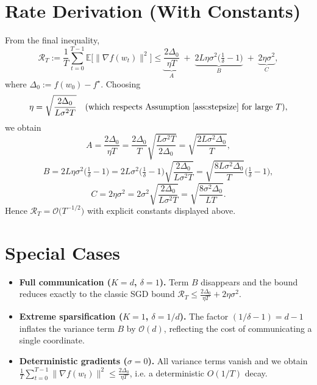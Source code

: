 \documentclass{article}
\newcommand{\E}{\mathbb{E}}
\begin{document}
\section*{Rate Derivation (With Constants)}
From the final inequality,
\[
\mathcal{R}_T:=\frac{1}{T}\sum_{t=0}^{T-1}\E\!\bigl[\|\nabla f(w_t)\|^{2}\bigr]
\le
\underbrace{\frac{2\Delta_0}{\eta T}}_{A}
\;+\;
\underbrace{2L\eta\sigma^{2}\bigl(\tfrac{1}{\delta}-1\bigr)}_{B}
\;+\;
\underbrace{2\eta\sigma^{2}}_{C},
\]
where $\Delta_0:=f(w_0)-f^{\star}$.  Choosing
\[
\eta = \sqrt{\frac{2\Delta_0}{L\sigma^{2}T}}\quad\text{(which respects Assumption~\ref{ass:stepsize} for large $T$)},
\]
we obtain
\[
A = \frac{2\Delta_0}{\eta T}= \frac{2\Delta_0}{T}\sqrt{\frac{L\sigma^{2}T}{2\Delta_0}} = \sqrt{\frac{2L\sigma^{2}\Delta_0}{T}},
\]
\[
B = 2L\eta\sigma^{2}\bigl(\tfrac{1}{\delta}-1\bigr)=
2L\sigma^{2}\bigl(\tfrac{1}{\delta}-1\bigr)\sqrt{\frac{2\Delta_0}{L\sigma^{2}T}}
= \sqrt{\frac{8L\sigma^{2}\Delta_0}{T}}\bigl(\tfrac{1}{\delta}-1\bigr),
\]
\[
C = 2\eta\sigma^{2}=2\sigma^{2}\sqrt{\frac{2\Delta_0}{L\sigma^{2}T}}
= \sqrt{\frac{8\sigma^{2}\Delta_0}{L T}}.
\]
Hence $\mathcal{R}_T = \mathcal{O}\!\bigl(T^{-1/2}\bigr)$ with explicit constants displayed above.

\section*{Special Cases}
\begin{itemize}
\item \textbf{Full communication ($K=d$, $\delta=1$).}  
Term $B$ disappears and the bound reduces exactly to the classic SGD bound
$\mathcal{R}_T\le \frac{2\Delta_0}{\eta T}+2\eta\sigma^{2}$.
\item \textbf{Extreme sparsification ($K=1$, $\delta=1/d$).}  
The factor $(1/\delta-1)=d-1$ inflates the variance term $B$ by $\mathcal{O}(d)$, reflecting the cost of communicating a single coordinate.
\item \textbf{Deterministic gradients ($\sigma=0$).}  
All variance terms vanish and we obtain
$\frac{1}{T}\sum_{t=0}^{T-1}\|\nabla f(w_t)\|^{2}\le \frac{2\Delta_0}{\eta T}$,
i.e. a deterministic $O(1/T)$ decay.
\end{itemize}
\end{document}
